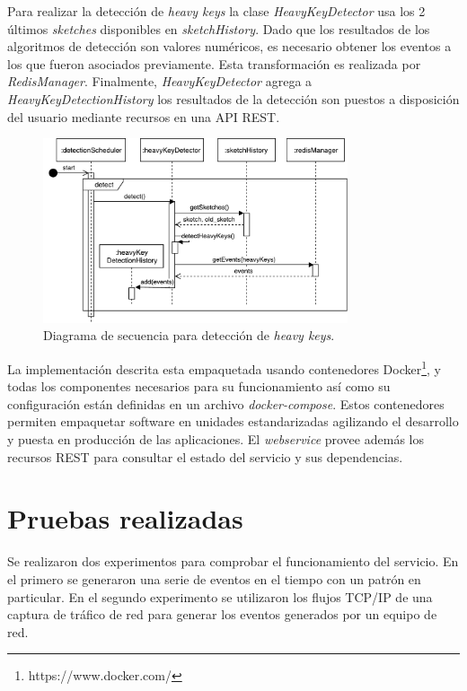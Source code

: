\documentclass[a4paper,10pt, oneside]{article}
\begin{document}
Para realizar la detección de \textit{heavy keys} la clase \textit{HeavyKeyDetector} usa los 2 últimos \textit{sketches} disponibles en \textit{sketchHistory}. Dado que los resultados de los algoritmos de detección son valores numéricos, es necesario obtener los eventos a los que fueron asociados previamente. Esta transformación es realizada por \textit{RedisManager}. Finalmente, \textit{HeavyKeyDetector} agrega a \textit{HeavyKeyDetectionHistory} los resultados de la detección son puestos a disposición del usuario mediante recursos en una API REST.

\begin{figure}[htbp]
	\centering
	\includegraphics[width=0.8\textwidth]{graph/SecDiag-detectionSchedulerDetect.pdf}
	\caption{Diagrama de secuencia para detección de \textit{heavy keys}.}
	\label{fig:SecDiagDetectionSchedulerDetect}
\end{figure}

La implementación descrita esta empaquetada usando contenedores Docker\footnote{https://www.docker.com/}, y todas los componentes necesarios para su funcionamiento así como su configuración están definidas en un archivo \textit{docker-compose}. Estos contenedores permiten empaquetar software en unidades estandarizadas agilizando el desarrollo y puesta en producción de las aplicaciones. El \textit{webservice} provee además los recursos REST para consultar el estado del servicio y sus dependencias.

\section{Pruebas realizadas}

Se realizaron dos experimentos para comprobar el funcionamiento del servicio. En el primero se generaron una serie de eventos en el tiempo con un patrón en particular. En el segundo experimento se utilizaron los flujos TCP/IP de una captura de tráfico de red para generar los eventos generados por un equipo de red. 
\end{document}
